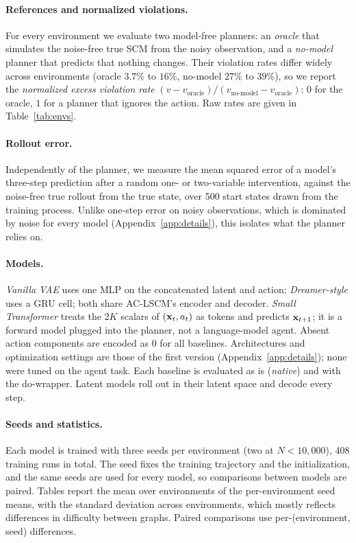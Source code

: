 \paragraph{References and normalized violations.}
For every environment we evaluate two model-free planners: an \emph{oracle}
that simulates the noise-free true SCM from the noisy observation, and a
\emph{no-model} planner that predicts that nothing changes. Their violation
rates differ widely across environments (oracle $3.7\%$ to $16\%$, no-model
$27\%$ to $39\%$), so we report the \emph{normalized excess violation rate}
$(v - v_{\text{oracle}}) / (v_{\text{no-model}} - v_{\text{oracle}})$: $0$
for the oracle, $1$ for a planner that ignores the action. Raw rates are
given in Table~\ref{tab:envs}.

\paragraph{Rollout error.}
Independently of the planner, we measure the mean squared error of a model's
three-step prediction after a random one- or two-variable intervention,
against the noise-free true rollout from the true state, over 500 start
states drawn from the training process. Unlike one-step error on noisy
observations, which is dominated by noise for every model (Appendix~\ref{app:details}),
this isolates what the planner relies on.

\paragraph{Models.}
\emph{Vanilla VAE} uses one MLP on the concatenated latent and action;
\emph{Dreamer-style} uses a GRU cell; both share AC-LSCM's encoder and decoder.
\emph{Small Transformer} treats the $2K$ scalars of $(\mathbf{x}_t, a_t)$ as tokens
and predicts $\mathbf{x}_{t+1}$; it is a forward model plugged into the planner, not a
language-model agent. Absent action components are encoded as $0$ for all
baselines. Architectures and optimization settings are those of the first
version (Appendix~\ref{app:details}); none were tuned on the agent task. Each
baseline is evaluated as is (\emph{native}) and with the do-wrapper. Latent
models roll out in their latent space and decode every step.

\paragraph{Seeds and statistics.}
Each model is trained with three seeds per environment (two at $N < 10{,}000$),
408 training runs in total. The seed fixes the training trajectory and the
initialization, and the same seeds are used for every model, so comparisons
between models are paired. Tables report the mean over environments of the
per-environment seed means, with the standard deviation across environments,
which mostly reflects differences in difficulty between graphs. Paired
comparisons use per-(environment, seed) differences.

